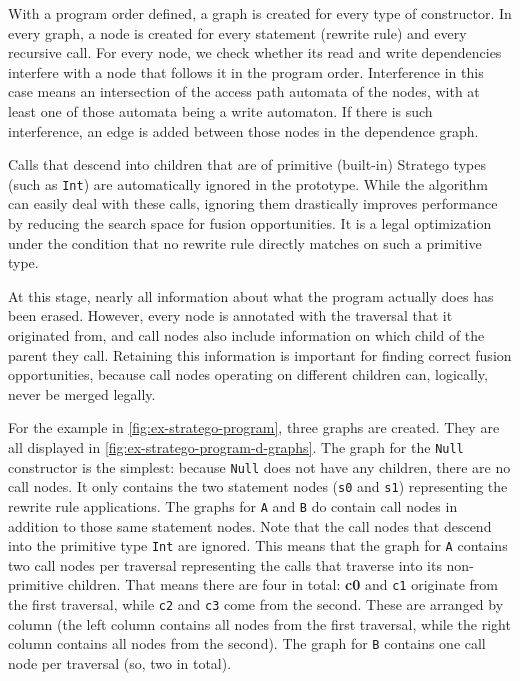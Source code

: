 With a program order defined, a graph is created for every type of constructor. In every graph, a node is created for every statement (rewrite rule) and every recursive call. For every node, we check whether its read and write dependencies interfere with a node that follows it in the program order. Interference in this case means an intersection of the access path automata of the nodes, with at least one of those automata being a write automaton. If there is such interference, an edge is added between those nodes in the dependence graph.

Calls that descend into children that are of primitive (built-in) Stratego types (such as \texttt{Int}) are automatically ignored in the prototype. While the algorithm can easily deal with these calls, ignoring them drastically improves performance by reducing the search space for fusion opportunities. It is a legal optimization under the condition that no rewrite rule directly matches on such a primitive type.

At this stage, nearly all information about what the program actually does has been erased. However, every node is annotated with the traversal that it originated from, and call nodes also include information on which child of the parent they call. Retaining this information is important for finding correct fusion opportunities, because call nodes operating on different children can, logically, never be merged legally.

For the example in \autoref{fig:ex-stratego-program}, three graphs are created. They are all displayed in \autoref{fig:ex-stratego-program-d-graphs}. The graph for the \texttt{Null} constructor is the simplest: because \texttt{Null} does not have any children, there are no call nodes. It only contains the two statement nodes (\texttt{s0} and \texttt{s1}) representing the rewrite rule applications. The graphs for \texttt{A} and \texttt{B} do contain call nodes in addition to those same statement nodes. Note that the call nodes that descend into the primitive type \texttt{Int} are ignored. This means that the graph for \texttt{A} contains two call nodes per traversal representing the calls that traverse into its non-primitive children. That means there are four in total: \textbf{c0} and \texttt{c1} originate from the first traversal, while \texttt{c2} and \texttt{c3} come from the second. These are arranged by column (the left column contains all nodes from the first traversal, while the right column contains all nodes from the second). The graph for \texttt{B} contains one call node per traversal (so, two in total).

